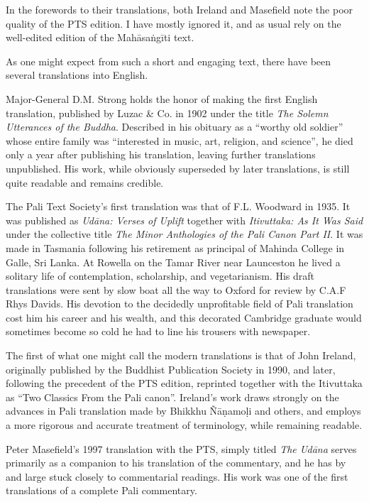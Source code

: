 \documentclass[12pt,openany]{book}%
\begin{document}
In the forewords to their translations, both Ireland and Masefield note the poor quality of the PTS edition. I have mostly ignored it, and as usual rely on the well-edited edition of the \textsanskrit{Mahāsaṅgīti} text.

As one might expect from such a short and engaging text, there have been several translations into English. 

Major-General D.M. Strong holds the honor of making the first English translation, published by Luzac \& Co. in 1902 under the title \textit{The Solemn Utterances of the Buddha}. Described in his obituary as a “worthy old soldier” whose entire family was “interested in music, art, religion, and science”, he died only a year after publishing his translation, leaving further translations unpublished. His work, while obviously superseded by later translations, is still quite readable and remains credible.

The Pali Text Society’s first translation was that of F.L. Woodward in 1935. It was published as \textit{\textsanskrit{Udāna}: Verses of Uplift} together with \textit{Itivuttaka: As It Was Said} under the collective title \textit{The Minor Anthologies of the Pali Canon Part II}. It was made in Tasmania following his retirement as principal of Mahinda College in Galle, Sri Lanka. At Rowella on the Tamar River near Launceston he lived a solitary life of contemplation, scholarship, and vegetarianism. His draft translations were sent by slow boat all the way to Oxford for review by C.A.F Rhys Davids. His devotion to the decidedly unprofitable field of Pali translation cost him his career and his wealth, and this decorated Cambridge graduate would sometimes become so cold he had to line his trousers with newspaper. 

The first of what one might call the modern translations is that of John Ireland, originally published by the Buddhist Publication Society in 1990, and later, following the precedent of the PTS edition, reprinted together with the Itivuttaka as “Two Classics From the Pali canon”. Ireland’s work draws strongly on the advances in Pali translation made by Bhikkhu \textsanskrit{Ñāṇamoḷi} and others, and employs a more rigorous and accurate treatment of terminology, while remaining readable. 

Peter Masefield’s 1997 translation with the PTS, simply titled \textit{The \textsanskrit{Udāna}} serves primarily as a companion to his translation of the commentary, and he has by and large stuck closely to commentarial readings. His work was one of the first translations of a complete Pali commentary.
\end{document}

